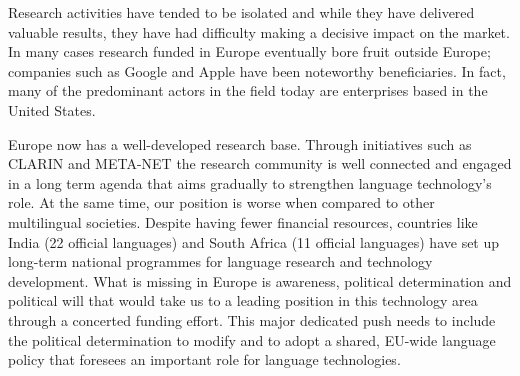 \documentclass[10pt, plain]{../../metanetpaper}
\begin{document}
\begin{multicols}{2}
Research activities have tended to be isolated and while they have delivered valuable results, they have had difficulty making a decisive impact on the market. In many cases research funded in Europe eventually bore fruit outside Europe; companies such as Google and Apple have been noteworthy beneficiaries. In fact, many of the predominant actors in the field today are enterprises based in the United States.

%
%
%
%

Europe now has a well-developed research base. Through initiatives such as CLARIN and META-NET the research community is well connected and engaged in a long term agenda that aims gradually to strengthen language technology's role. At the same time, our position is worse when compared to other multilingual societies. Despite having fewer financial resources, countries like India (22 official languages) and South Africa (11 official languages) have set up long-term national programmes for language research and technology development. What is missing in Europe is awareness, political determination and political will that would take us to a leading position in this technology area through a concerted funding effort. This major dedicated push needs to include the political determination to modify and to adopt a shared, EU-wide language policy that foresees an important role for language technologies. 


\end{multicols}
\end{document}
